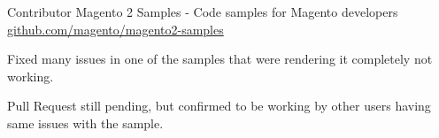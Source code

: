 \begin{cventries}
  \cventry
    {Contributor} %
    {Magento 2 Samples - Code samples for Magento developers} %
    {\href{https://github.com/magento/magento2-samples} {github.com/magento/magento2-samples}} %
    {} %
    {
      \begin{cvitems} %
        \item {Fixed many issues in one of the samples that were rendering it completely not working.}
        \item {Pull Request still pending, but confirmed to be working by other users having same issues with the sample.}
      \end{cvitems}
    }

\end{cventries}

